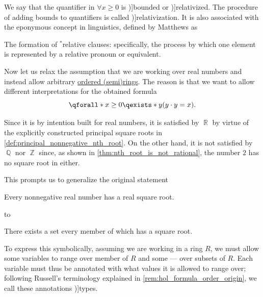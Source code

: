 \begin{concept}
\begin{thmenum}
    We say that the quantifier in \( \forall {x \geq 0} \) is \term[en=bounded quantifiers (\cite[369]{UnivalentFoundationsProgram2013HoTT})]{bounded} or \term[en=relativized quantifiers (\cite[79]{Andrews2002Logic})]{relativized}. The procedure of adding bounds to quantifiers is called \term[en=relativization (\cite[def. 2.6.42]{Hinman2005Logic})]{relativization}. It is also associated with the eponymous concept in linguistics, defined by Matthews as
    \begin{displayquote}
      The formation of \( {}^* \)relative clauses: specifically, the process by which one element is represented by a relative pronoun or equivalent.
    \end{displayquote}

     Now let us relax the assumption that we are working over real numbers and instead allow arbitrary \hyperref[def:ordered_semiring]{ordered (semi)rings}. The reason is that we want to allow different interpretations for the obtained formula
    \begin{equation*}
      \qforall* {x \geq 0} \qexists* y (y \cdot y = x).
    \end{equation*}

    Since it is by intention built for real numbers, it is satisfied by \( \BbbR \) by virtue of the explicitly constructed principal square roots in \cref{def:principal_nonnegative_nth_root}. On the other hand, it is not satisfied by \( \BbbQ \) nor \( \BbbZ \) since, as shown in \cref{thm:nth_root_is_not_rational}, the number \( 2 \) has no square root in either.

     This prompts us to generalize the original statement
    \begin{displayquote}
      Every nonnegative real number has a real square root.
    \end{displayquote}
    to
    \begin{displayquote}
      There exists a set every member of which has a square root.
    \end{displayquote}

    To express this symbolically, assuming we are working in a ring \( R \), we must allow some variables to range over member of \( R \) and some --- over subsets of \( R \). Each variable must thus be annotated with what values it is allowed to range over; following Russell's terminology explained in \cref{rem:hol_formula_order_origin}, we call these annotations \term[en=type (\cite[236]{Russell1908TypeTheory})]{types}.


\end{thmenum}
\end{concept}
